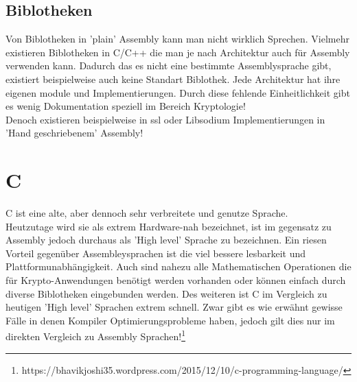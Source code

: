 \documentclass[a4paper,12pt]{scrartcl}
\begin{document}
\subsection{Biblotheken}
Von Biblotheken in 'plain' Assembly kann man nicht wirklich Sprechen. Vielmehr existieren Biblotheken in  C/C++ die man je nach Architektur auch für Assembly verwenden kann.
Dadurch  das es nicht eine bestimmte Assemblysprache gibt, existiert beispielweise auch keine Standart Biblothek. Jede Architektur hat ihre eigenen module und Implementierungen. Durch diese fehlende Einheitlichkeit gibt es wenig Dokumentation speziell im Bereich Kryptologie!\\
Denoch existieren beispielweise  in ssl oder Libsodium Implementierungen in 'Hand geschriebenem' Assembly!


\newpage
\section{C}
C ist eine alte, aber dennoch sehr verbreitete und genutze Sprache. \\Heutzutage wird sie als extrem Hardware-nah bezeichnet, ist im gegensatz zu Assembly jedoch durchaus als 'High level' Sprache zu bezeichnen. Ein riesen Vorteil gegenüber Assembleysprachen ist die viel bessere lesbarkeit und Plattformunabhängigkeit.
Auch sind nahezu alle Mathematischen Operationen die für Krypto-Anwendungen benötigt werden vorhanden oder können einfach durch diverse Biblotheken eingebunden werden. Des weiteren ist C im Vergleich zu heutigen 'High level' Sprachen extrem schnell. Zwar gibt es wie erwähnt gewisse Fälle in denen Kompiler Optimierungsprobleme haben, jedoch gilt dies nur im direkten Vergleich zu Assembly Sprachen!\footnote{https://bhavikjoshi35.wordpress.com/2015/12/10/c-programming-language/}\\
\end{document}
